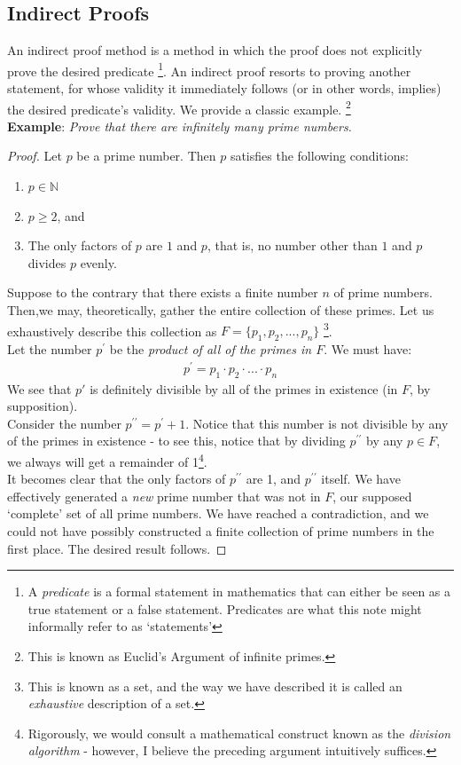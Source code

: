\documentclass[10pt,a4paper,fleqn]{article}
\newcommand{\example}[1]{\textbf{Example}: \emph{#1}}
\let \oldprime \prime
\renewcommand{\prime}{^{\oldprime}}
\newcommand{\dprime}{^{\oldprime\oldprime}}
\begin{document}
	\subsection{Indirect Proofs}
	An indirect proof method is a method in which the proof does not explicitly prove the desired predicate \footnote{A \emph{predicate} is a formal statement in mathematics that can either be seen as a true statement or a false statement. Predicates are what this note might informally refer to as `statements'}. An indirect proof resorts to proving another statement, for whose validity it immediately follows (or in other words, implies) the desired predicate's validity. We provide a classic example. \footnote{This is known as Euclid's Argument of infinite primes.} \\
		
		\noindent \example{Prove that there are infinitely many prime numbers.}
		\begin{proof} 
			Let $p$ be a prime number. Then $p$ satisfies the following conditions:
				\begin{enumerate}
					\item $p \in \mathbb{N}$
					\item $p \geq 2$, and
					\item The only factors of $p$ are $1$ and $p$, that is, no number other than $1$ and $p$ divides $p$ evenly.
				\end{enumerate}
			Suppose to the contrary that there exists a finite number $n$ of prime numbers. \\
			Then,we may, theoretically, gather the entire collection of these primes. Let us exhaustively describe this collection as $F = \{p_1, p_2, ..., p_n\}$ \footnote{This is known as a set, and the way we have described it is called an \emph{exhaustive} description of a set.}. \\
			Let the number $p\prime$ be the \emph{product of all of the primes in $F$}. We must have:
			\begin{align*}
				p\prime = p_1 \cdot p_2 \cdot ... \cdot p_n
			\end{align*}
			We see that $p'$ is definitely divisible by all of the primes in existence (in $F$, by supposition). \\
			Consider the number $p \dprime = p \prime + 1$. Notice that this number is not divisible by any of the primes in existence - to see this, notice that by dividing $p \dprime $ by any $p \in F$, we always will get a remainder of 1\footnote{Rigorously, we would consult a mathematical construct known as the \emph{division algorithm} - however, I believe the preceding argument intuitively suffices.}.\\

			It becomes clear that the only factors of $p \dprime$ are 1, and $p \dprime$ itself. We have effectively generated a \emph{new} prime number that was not in $F$, our supposed `complete' set of all prime numbers. We have reached a contradiction, and we could not have possibly constructed a finite collection of prime numbers in the first place. The desired result follows.	\end{proof}
	
\end{document}
